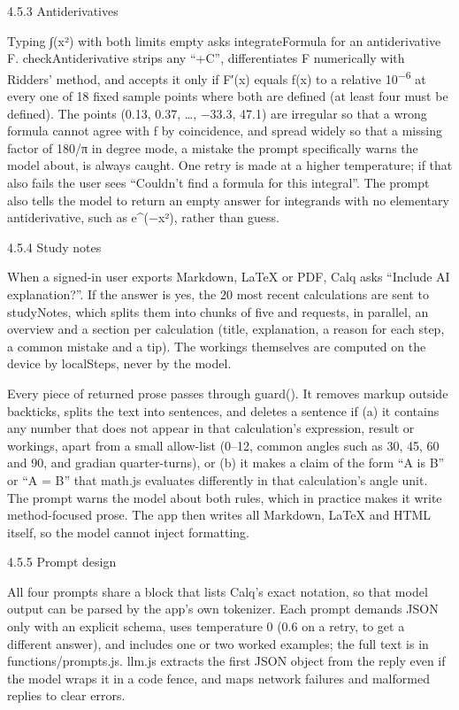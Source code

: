 \documentclass[12pt]{article}
\newcommand{\Hthree}[2]{\par\needspace{4\baselineskip}\vspace{2pt}%
  {\fontsize{14}{17}\selectfont\color{head}#1\par}\nopagebreak}
\begin{document}
\Hthree{4.5.3 Antiderivatives}{4.5.3 Antiderivatives}

Typing ∫(x²) with both limits empty asks integrateFormula for an antiderivative F. checkAntiderivative strips any “+C”, differentiates F numerically with Ridders’ method, and accepts it only if F′(x) equals f(x) to a relative 10\textsuperscript{−6} at every one of 18 fixed sample points where both are defined (at least four must be defined). The points (0.13, 0.37, …, −33.3, 47.1) are irregular so that a wrong formula cannot agree with f by coincidence, and spread widely so that a missing factor of 180/π in degree mode, a mistake the prompt specifically warns the model about, is always caught. One retry is made at a higher temperature; if that also fails the user sees “Couldn’t find a formula for this integral”. The prompt also tells the model to return an empty answer for integrands with no elementary antiderivative, such as e\textasciicircum{}(−x²), rather than guess.

\Hthree{4.5.4 Study notes}{4.5.4 Study notes}

When a signed-in user exports Markdown, LaTeX or PDF, Calq asks “Include AI explanation?”. If the answer is yes, the 20 most recent calculations are sent to studyNotes, which splits them into chunks of five and requests, in parallel, an overview and a section per calculation (title, explanation, a reason for each step, a common mistake and a tip). The workings themselves are computed on the device by localSteps, never by the model.

Every piece of returned prose passes through guard(). It removes markup outside backticks, splits the text into sentences, and deletes a sentence if (a) it contains any number that does not appear in that calculation’s expression, result or workings, apart from a small allow-list (0–12, common angles such as 30, 45, 60 and 90, and gradian quarter-turns), or (b) it makes a claim of the form “A is B” or “A = B” that math.js evaluates differently in that calculation’s angle unit. The prompt warns the model about both rules, which in practice makes it write method-focused prose. The app then writes all Markdown, LaTeX and HTML itself, so the model cannot inject formatting.

\Hthree{4.5.5 Prompt design}{4.5.5 Prompt design}

All four prompts share a block that lists Calq’s exact notation, so that model output can be parsed by the app’s own tokenizer. Each prompt demands JSON only with an explicit schema, uses temperature 0 (0.6 on a retry, to get a different answer), and includes one or two worked examples; the full text is in functions/prompts.js. llm.js extracts the first JSON object from the reply even if the model wraps it in a code fence, and maps network failures and malformed replies to clear errors.
\end{document}

